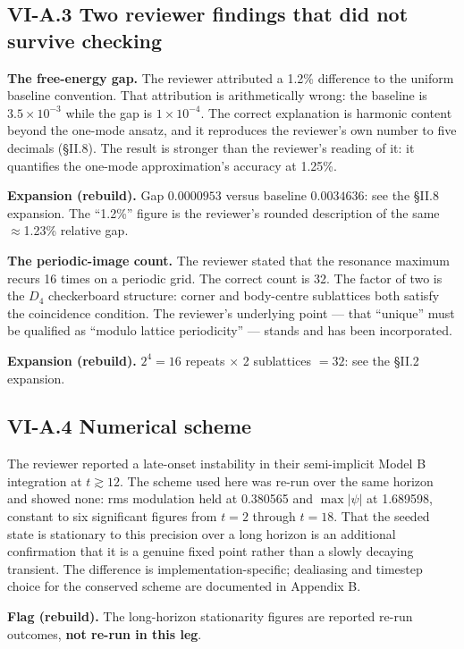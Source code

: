 \documentclass[11pt,a4paper]{article}
\newcommand{\expansion}[1]{\par\smallskip\noindent\textbf{Expansion (rebuild).} #1\par\smallskip}
\newcommand{\flagbox}[1]{\par\smallskip\noindent\textbf{Flag (rebuild).} #1\par\smallskip}
\begin{document}
\subsection{VI-A.3 Two reviewer findings that did not survive checking}
\textbf{The free-energy gap.} The reviewer attributed a 1.2\% difference to the uniform baseline convention. That attribution is arithmetically wrong: the baseline is $3.5\times10^{-3}$ while the gap is $1\times10^{-4}$. The correct explanation is harmonic content beyond the one-mode ansatz, and it reproduces the reviewer's own number to five decimals (\S II.8). The result is stronger than the reviewer's reading of it: it quantifies the one-mode approximation's accuracy at 1.25\%.
\expansion{Gap $0.0000953$ versus baseline $0.0034636$: see the \S II.8 expansion. The ``1.2\%'' figure is the reviewer's rounded description of the same $\approx$1.23\% relative gap.}

\textbf{The periodic-image count.} The reviewer stated that the resonance maximum recurs 16 times on a periodic grid. The correct count is 32. The factor of two is the $D_4$ checkerboard structure: corner and body-centre sublattices both satisfy the coincidence condition. The reviewer's underlying point --- that ``unique'' must be qualified as ``modulo lattice periodicity'' --- stands and has been incorporated.
\expansion{$2^4 = 16$ repeats $\times$ 2 sublattices $= 32$: see the \S II.2 expansion.}

\subsection{VI-A.4 Numerical scheme}
The reviewer reported a late-onset instability in their semi-implicit Model B integration at $t \gtrsim 12$. The scheme used here was re-run over the same horizon and showed none: rms modulation held at 0.380565 and $\max|\psi|$ at 1.689598, constant to six significant figures from $t = 2$ through $t = 18$. That the seeded state is stationary to this precision over a long horizon is an additional confirmation that it is a genuine fixed point rather than a slowly decaying transient. The difference is implementation-specific; dealiasing and timestep choice for the conserved scheme are documented in Appendix B.
\flagbox{The long-horizon stationarity figures are reported re-run outcomes, \textbf{not re-run in this leg}.}

\end{document}
